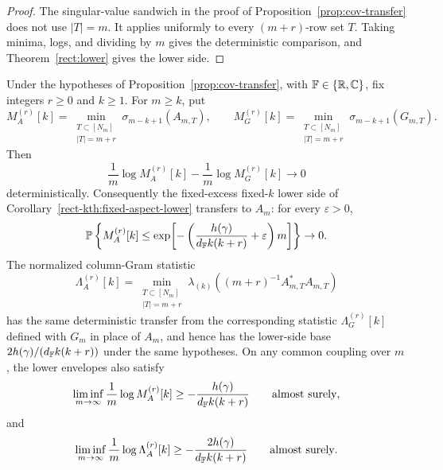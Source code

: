 \begin{proof}
The singular-value sandwich in the proof of Proposition~\ref{prop:cov-transfer}
does not use \(|T|=m\).  It applies uniformly to every \((m+r)\)-row set \(T\).
Taking minima, logs, and dividing by \(m\) gives the deterministic comparison,
and Theorem~\ref{rect:lower} gives the lower side.
\end{proof}

\begin{corollary}\label{cor:fixed-excess-fixed-k-transfer}
Under the hypotheses of Proposition~\ref{prop:cov-transfer}, with
\(\mathbb{F}\in\{\mathbb{R},\mathbb{C}\}\), fix integers \(r\ge0\) and \(k\ge1\).  For \(m\ge k\), put
\[
  M_A^{(r)}[k]=
  \min_{\substack{T\subset[N_m]\\ |T|=m+r}}\sigma_{m-k+1}(A_{m,T}),
  \qquad
  M_G^{(r)}[k]=
  \min_{\substack{T\subset[N_m]\\ |T|=m+r}}\sigma_{m-k+1}(G_{m,T}).
\]
Then
\[
  \frac1m\log M_A^{(r)}[k]-\frac1m\log M_G^{(r)}[k]\to0
\]
deterministically.  Consequently the fixed-excess fixed-\(k\) lower side of
Corollary~\ref{rect-kth:fixed-aspect-lower} transfers to \(A_m\): for every
\(\varepsilon>0\),
\[
  \mathbb{P}\left\{M_A^{(r)}[k]\le
  \exp\!\left[-\left(\frac{h(\gamma)}{d_{\mathbb{F}} k(k+r)}+\varepsilon\right)m\right]\right\}
  \to0.
\]
The normalized column-Gram statistic
\[
  \Lambda_A^{(r)}[k]
  =
  \min_{\substack{T\subset[N_m]\\ |T|=m+r}}
  \lambda_{(k)}\!\left((m+r)^{-1}A_{m,T}^*A_{m,T}\right)
\]
has the same deterministic transfer from the corresponding statistic
\(\Lambda_G^{(r)}[k]\) defined with \(G_m\) in place of \(A_m\), and hence has
the lower-side base \(2h(\gamma)/(d_{\mathbb{F}} k(k+r))\) under the same hypotheses.
On any common coupling over \(m\), the lower envelopes also satisfy
\[
  \liminf_{m\to\infty}\frac1m\log M_A^{(r)}[k]
  \ge -\frac{h(\gamma)}{d_{\mathbb{F}} k(k+r)}
  \qquad\hbox{almost surely},
\]
and
\[
  \liminf_{m\to\infty}\frac1m\log \Lambda_A^{(r)}[k]
  \ge -\frac{2h(\gamma)}{d_{\mathbb{F}} k(k+r)}
  \qquad\hbox{almost surely}.
\]
\end{corollary}

